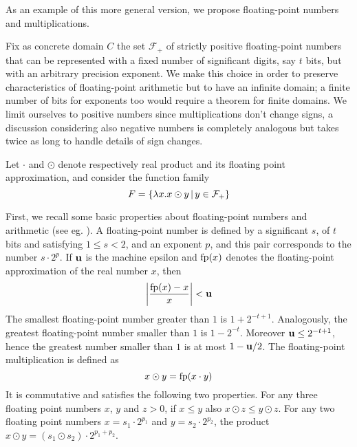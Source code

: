 As an example of this more general version, we propose floating-point numbers and multiplications.
\begin{example}\label{ch4:ex:fp-numbers-local}
	Fix as concrete domain $C$ the set $\mathcal{F_+}$ of strictly positive floating-point numbers that can be represented with a fixed number of significant digits, say $t$ bits, but with an arbitrary precision exponent. We make this choice in order to preserve characteristics of floating-point arithmetic but to have an infinite domain; a finite number of bits for exponents too would require a theorem for finite domains. We limit ourselves to positive numbers since multiplications don't change signs, a discussion considering also negative numbers is completely analogous but takes twice as long to handle details of sign changes.

	Let $\cdot$ and $\odot$ denote respectively real product and its floating point approximation, and consider the function family
	\[
	F = \{ \lambda x . x \odot y \,\vert\, y \in \mathcal{F_+} \}
	\]

	First, we recall some basic properties about floating-point numbers and arithmetic (see eg. \cite{overton-num-analysis-book}). A floating-point number is defined by a significant $s$, of $t$ bits and satisfying $1 \le s < 2$, and an exponent $p$, and this pair corresponds to the number $s \cdot 2^p$. If $\textbf{u}$ is the machine epsilon and $\text{fp}(x)$ denotes the floating-point approximation of the real number $x$, then
	\[
	\left\lvert \frac{\text{fp}(x) - x}{x} \right\rvert < \textbf{u}
	\]
	The smallest floating-point number greater than $1$ is $1 + 2^{-t+1}$. Analogously, the greatest floating-point number smaller than $1$ is $1 - 2^{-t}$. Moreover $\textbf{u} \le 2^{-t+1}$, hence the greatest number smaller than $1$ is at most $1 - \textbf{u} / 2$.
	The floating-point multiplication is defined as
	\[
	x \odot y = \text{fp}(x \cdot y)
	\]
	It is commutative and satisfies the following two properties.
	For any three floating point numbers $x$, $y$ and $z > 0$, if $x \le y$ also $x \odot z \le y \odot z$.
	For any two floating point numbers $x = s_1 \cdot 2^{p_1}$ and $y = s_2 \cdot 2^{p_2}$, the product $x \odot y = (s_1 \odot s_2) \cdot 2^{p_1 + p_2}$.


\end{example}
